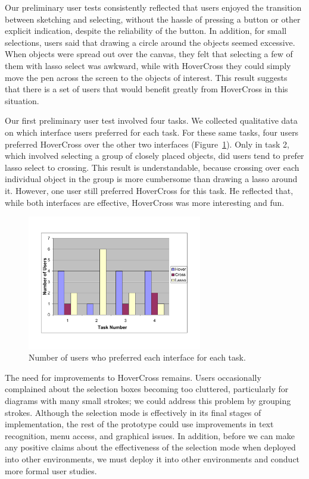 \documentclass{article}
\begin{document}
Our preliminary user tests consistently reflected that users enjoyed the
transition between sketching and selecting, without the hassle of
pressing a button or other explicit indication, despite the
reliability of the button.  In addition, for small selections, users said that drawing
a circle around the objects seemed excessive.  When objects were spread
out over the canvas, they felt that selecting a few of them with lasso
select was awkward, while with HoverCross they could simply move the
pen across the screen to the objects of interest.  This result suggests that
there is a set of users that would benefit greatly from HoverCross in
this situation.

Our first preliminary user test involved four tasks.  We collected qualitative data on which interface users preferred for each task.  For these same tasks, four users preferred HoverCross over the other
two interfaces (Figure~\ref{tab:pref}).  Only in task 2, which involved selecting a group of closely placed objects, did users tend to prefer lasso select to crossing.  This result is
understandable, because crossing over each individual object in the
group is more cumbersome than drawing a lasso around it.  However, one
user still preferred HoverCross for this task.  He reflected that,
while both interfaces are effective, HoverCross was more interesting
and fun.

\begin{figure}
\begin{center}
\includegraphics[width=3.0in]{Preferences}
\caption{Number of users who preferred each interface for each task.}
\label{tab:pref}
\end{center}
\end{figure}

The need for improvements to HoverCross remains.  Users occasionally complained about the selection boxes becoming too cluttered, particularly for diagrams with many small strokes; we could address this problem by grouping strokes.  Although the selection mode is effectively in its final stages of implementation, the rest of the prototype could use improvements in text recognition, menu access, and graphical issues.  In addition, before we can make any positive claims about the effectiveness of the selection mode when deployed into other environments, we must deploy it into other environments and conduct more formal user studies.
\end{document}
